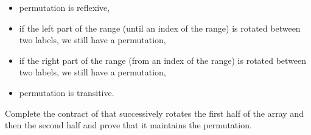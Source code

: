 \begin{itemize}
\item permutation is reflexive,
\item if the left part of the range (until an index of the range) is rotated
  between two labels, we still have a permutation,
\item if the right part of the range (from an index of the range) is rotated
  between two labels, we still have a permutation,
\item permutation is transitive.
\end{itemize}


Complete the contract of  that successively rotates the
first half of the array and then the second half and prove that it maintains the
permutation.

